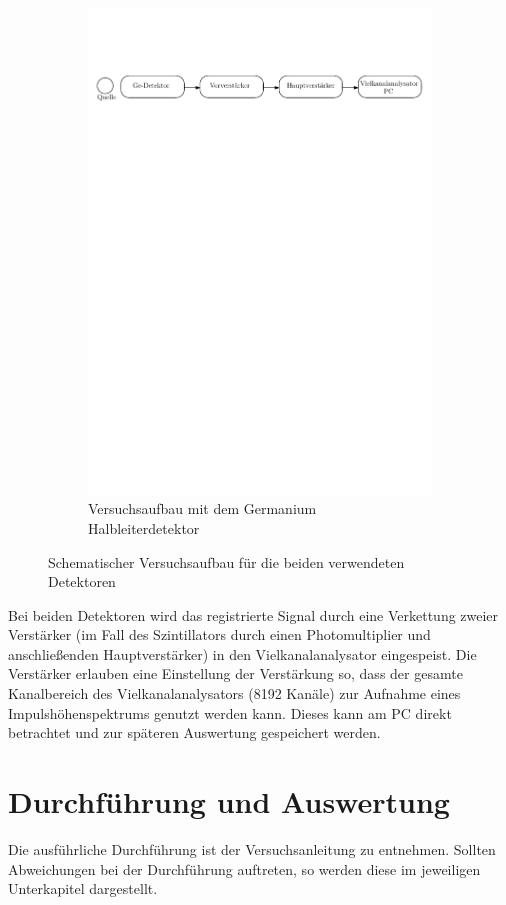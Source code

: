 \documentclass[11pt, a4paper]{article}
\numberwithin{equation}{section}
\begin{document}
\begin{figure}[ht]
\begin{subfigure}{\textwidth}
		\includegraphics[width=\textwidth]{./figures/aufbau_halb.pdf}
		\caption{Versuchsaufbau mit dem Germanium Halbleiterdetektor}	
	\end{subfigure}
	\caption{Schematischer Versuchsaufbau für die beiden verwendeten Detektoren}
	\label{fig:aufbau}
\end{figure}
Bei beiden Detektoren wird das registrierte Signal durch eine Verkettung zweier Verstärker (im Fall des Szintillators durch einen Photomultiplier und anschließenden Hauptverstärker) in den Vielkanalanalysator eingespeist.
Die Verstärker erlauben eine Einstellung der Verstärkung so, dass der gesamte Kanalbereich des Vielkanalanalysators (\num{8192} Kanäle) zur Aufnahme eines Impulshöhenspektrums genutzt werden kann.
Dieses kann am PC direkt betrachtet und zur späteren Auswertung gespeichert werden.
\newpage

\section{Durchführung und Auswertung}
Die ausführliche Durchführung ist der Versuchsanleitung \cite{anleitung} zu entnehmen.
Sollten Abweichungen bei der Durchführung auftreten, so werden diese im jeweiligen Unterkapitel dargestellt.
\end{document}
